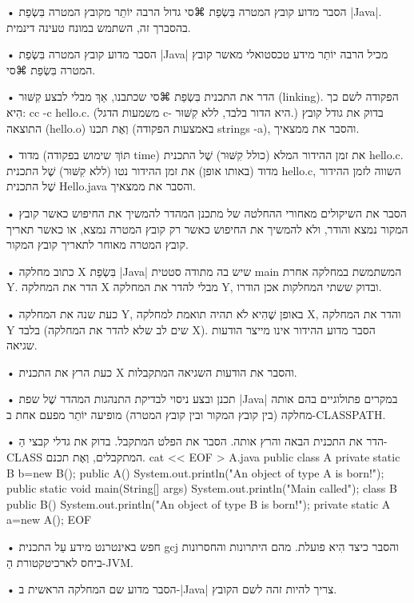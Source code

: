 \begin{enumerate}

• הסבר מדוע קובץ המטרה בִּשְׂפַת ⌘סי גדול הרבה יוֹתֵר מקובץ המטרה
בִּשְׂפַת \E|Java|. בהסברך זה, השתמש במונח טעינה דינמית.

• הסבר מדוע קובץ המטרה בִּשְׂפַת \E|Java| מכיל הרבה יוֹתֵר מידע טכסטואלי
מאשר קובץ המטרה בִּשְׂפַת ⌘סי.

• הדר את התכנית בִּשְׂפַת ⌘סי שכתבנו, אַךְ מבלי לבצע קִשּׁוּר (linking).
הפקודה לשם כך הִיא: cc -c hello.c. (משמעות הדגל c- היא הדור בלבד, ללא
קִשּׁוּר.) בדוק את גודל קובץ התוצאה (hello.o) וְאֶת תכנו (באמצעות הפקודה strings -a),
והסבר את ממצאיך.

• מדוד (תּוֹךְ שימוש בפקודה time) את זמן ההידור המלא (כולל קִשּׁוּר) שֶׁל
התכנית hello.c. מדוד (באותו אופן) את זמן ההידור נטו (ללא קִשּׁוּר) שֶׁל
התכנית hello.c, השווה לזמן ההידור שֶׁל התכנית Hello.java והסבר את
ממצאיך.

• הסבר את השיקולים מאחורי ההחלטה של מתכנן המהדר להמשיך את החיפוש כאשר קובץ
המקור נמצא והודר, ולא להמשיך את החיפוש כאשר רק קובץ המטרה נמצא, או
כאשר תאריך קובץ המטרה מאוחר לתאריך קובץ המקור.

• כתוב מחלקה X בִּשְׂפַת \E|Java| שיש בה מתודה סטטית main המשתמשת במחלקה אחרת
Y. הדר את המחלקה X מבלי להדר את המחלקה Y, ובדוק ששתי
המחלקות אכן הודרו.

• כעת שנה את המחלקה Y, באופן שֶׁהִיא לֹא תהיה תואמת למחלקה X, והדר
את המחלקה Y בלבד (שים לב שלא להדר את המחלקה X). הסבר מדוע
ההידור אינו מייצר הודעות שגיאה.

• כעת הרץ את התכנית X והסבר את הודעות השגיאה המתקבלות.

• תכנן ובצע ניסוי לבדיקת התנהגות המהדר שֶׁל שפת \E|Java| במקרים פתולוגיים בהם אותה
מחלקה (בין קובץ המקור ובין קובץ המטרה) מופיעה יוֹתֵר מפעם אחת
ב-CLASSPATH.

• הדר את התכנית הבאה והרץ אותה. הסבר את הפלט המתקבל. בדוק את גדלי קבצי
הַ-CLASS המתקבלים, וְאֶת תכנם.
cat << EOF > A.java
public class A {
   private static B b=new B();
   public A() { System.out.println("An object of type A is born!"); }
   public static void main(String[] args) {
     System.out.println("Main called\n");
   }
}
class B {
  public B() { System.out.println("An object of type B is born!"); }
  private static A a=new A();
}
EOF
\END

• חפש באינטרנט מידע עַל התכנית gcj והסבר כיצד הִיא פועלת. מהם היתרונות
  והחסרונות ביחס לארכיטקטורת הַ-JVM.

• הסבר מדוע שם המחלקה הראשית ב-|Java| צריך להיות זהה לשם הקובץ.


\end{enumerate}
